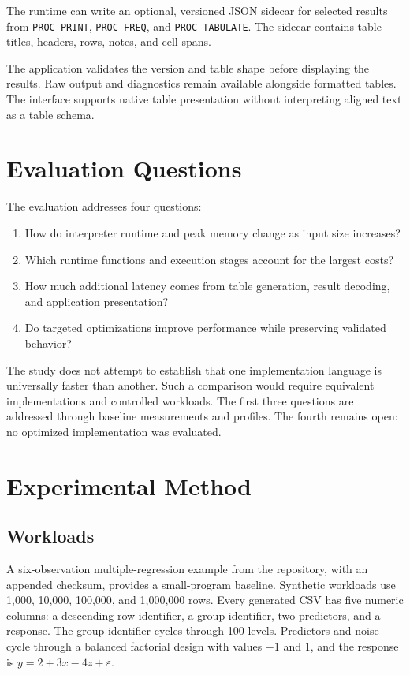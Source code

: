 \documentclass[11pt,a4paper]{article}
\begin{document}
The runtime can write an optional, versioned JSON sidecar for
selected results from \texttt{PROC PRINT},
\texttt{PROC FREQ}, and \texttt{PROC TABULATE}. The sidecar
contains table titles, headers, rows, notes, and cell spans.

The application validates the version and table shape before
displaying the results. Raw output and diagnostics remain
available alongside formatted tables. The interface supports
native table presentation without interpreting aligned text as
a table schema.

\section{Evaluation Questions}

The evaluation addresses four questions:
\begin{enumerate}
    \item How do interpreter runtime and peak memory change as
    input size increases?
    \item Which runtime functions and execution stages account
    for the largest costs?
    \item How much additional latency comes from table generation,
    result decoding, and application presentation?
    \item Do targeted optimizations improve performance while
    preserving validated behavior?
\end{enumerate}

The study does not attempt to establish that one implementation
language is universally faster than another. Such a comparison
would require equivalent implementations and controlled
workloads. The first three questions are addressed through
baseline measurements and profiles. The fourth remains open:
no optimized implementation was evaluated.

\section{Experimental Method}

\subsection{Workloads}

A six-observation multiple-regression example from the repository,
with an appended checksum, provides a small-program baseline.
Synthetic workloads use 1,000, 10,000, 100,000, and 1,000,000 rows.
Every generated CSV has five numeric columns: a descending row
identifier, a group identifier, two predictors, and a response.
The group identifier cycles through 100 levels. Predictors and
noise cycle through a balanced factorial design with values
$-1$ and $1$, and the response is
$y=2+3x-4z+\varepsilon$.
\end{document}
